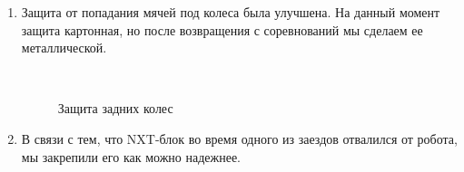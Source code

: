 \begin{enumerate}
	\item Защита от попадания мячей под колеса была улучшена. На данный момент защита картонная, но после возвращения с соревнований мы сделаем ее металлической.
	
	\begin{figure}[H]
		\begin{minipage}[h]{0.2\linewidth}
			\center  
		\end{minipage}
		\begin{minipage}[h]{0.6\linewidth}
			\caption{Защита задних колес}
		\end{minipage}
	\end{figure}
	
	\item В связи с тем, что NXT-блок во время одного из заездов отвалился от робота, мы закрепили его как можно надежнее.
	

\end{enumerate}
